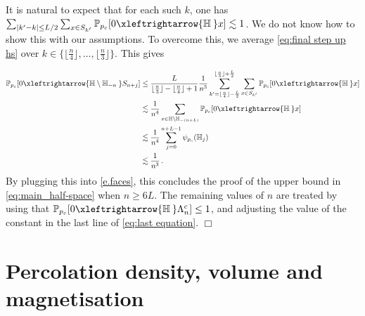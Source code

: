 \documentclass[11pt,a4paper]{article}
\numberwithin{equation}{section}
\theoremstyle{plain}
\theoremstyle{definition}
\newcommand{\connect}{\xleftrightarrow}
\newcommand{\QED}{\hfill \ensuremath{\Box}}
\let\qed=\QED
\newcommand{\1}{\mathbf 1}
\def\H{\mathbb{H}}
\def\P{\mathbb{P}} %
\def\bf{\bfseries}
\begin{document}
It is natural to expect that for each such $k$, one has $\sum_{|k'-k|\leq L/2}\sum_{x\in S_{k'}}  
\P_{p_c}[0\connect{\H\:} x]\lesssim 1$. We do not know how to show this with our assumptions. To overcome this, we average \eqref{eq:final step up hs} over $k\in \{ \lfloor \frac n 4 \rfloor  , \ldots, \lfloor \frac n 3 \rfloor \}$. This gives 

\begin{align}\label{eq:last equation}
\begin{split}
\P_{p_c}[0\connect{\H \setminus \H_{-n}\:} S_{n+j}]	
	 & \leq  
\frac{L}{\lfloor \frac n 3 \rfloor - \lfloor \frac n 4 \rfloor+1}  \frac 1 {n^3}\sum_{k'=\lfloor \frac n 4 \rfloor - \frac L 2}^{\lfloor \frac n 3 \rfloor + \frac L 2 }
	\sum_{x\in S_{k'}}  
	\P_{p_c}[0\connect{\H\:} x]   
	\\
	& \lesssim  \frac{1}{n^4}  \sum_{x\in \H \setminus \H_{-(n+L)}}  \P_{p_c}[0\connect{\H\:} x] \\
	& \lesssim  \frac{1}{n^4}\sum_{j=0}^{n+L-1} \psi_{p_c}(\H_j)  \\
	& \lesssim \frac{1}{n^3}\,.
	\end{split}
\end{align}
By plugging this into \eqref{e.faces}, this concludes the proof of the upper bound in \eqref{eq:main_half-space} when $n\geq 6L$. The remaining values of $n$ are treated by using that $\mathbb P_{p_c}[0\connect{\mathbb H\:}\Lambda_n^c]\leq 1$, and adjusting the value of the constant in the last line of \eqref{eq:last equation}.
\qed


\appendix

\section{Percolation density, volume and magnetisation}\label{sec:percodensity}
\end{document}
